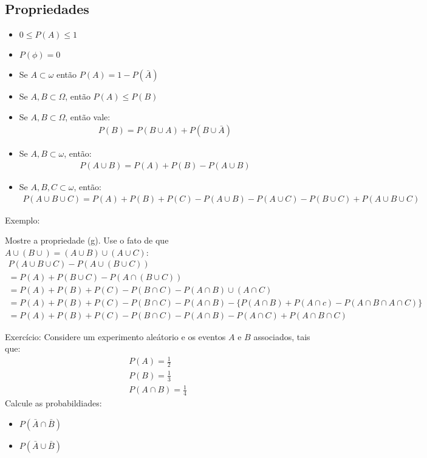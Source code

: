 \documentclass[11pt,a4paper]{article}
\begin{document}
\subsection{Propriedades}
\begin{itemize}
  \item $0 \le P(A) \le 1$
  \item $P(\phi)=0$
  \item Se $A \subset \omega$ então $P(A)=1-P(\bar{A})$
  \item Se $A,B \subset \Omega$, então $P(A) \le P(B)$
  \item Se $A,B \subset \Omega$, então vale:
    \begin{align}
      P(B)= P(B\cup A)+ P(B\cup \bar{A})
    \end{align}
  \item Se $A,B \subset \omega$, então:
    \begin{align}
      P(A\cup B)= P(A)+P(B)-P(A\cup B)
    \end{align}
  \item Se $A,B,C \subset \omega$, então:
    \begin{align}
      P(A\cup B \cup C)= P(A)+P(B)+P(C)-P(A \cup B)- P(A \cup C)-
      P(B\cup C)+P(A\cup B \cup C)
    \end{align}
\end{itemize}
Exemplo: 

Mostre a propriedade (g). Use o fato de que $A\cup (B \cup )=
(A\cup B )\cup (A \cup C )$:
\begin{align}
  P(A\cup B\cup C)- P(A \cup (B \cup C) )\\
  =P(A)+P(B\cup C)- P(A\cap(B\cup C) )\\
  =P(A)+P(B)+P(C)-P(B\cap C)- P(A \cap B)\cup (A \cap C)\\
  =P(A)+P(B)+P(C)-P(B\cap C)- P(A \cap B)-\big\{ P(A \cap B)+ P(A \cap c)-P(A \cap B \cap A \cap C)\big\}\\
  =P(A)+P(B)+P(C)-P(B\cap C)- P(A \cap B)- P(A \cap C)+ P(A \cap B \cap C)
\end{align}

Exercício: Considere um experimento aleátorio e os eventos $A$ e $B$ associados, tais que:
\begin{align*}
  P(A)= \frac{1}{2}\\
  P(B)= \frac{1}{3}\\
  P(A \cap B)= \frac{1}{4}
\end{align*}
Calcule as probabildiades:
\begin{itemize}
  \item $ P(\bar{A} \cap \bar{B})$
  \item $P(\bar{A} \cup \bar{B})$
\end{itemize}
\end{document}
